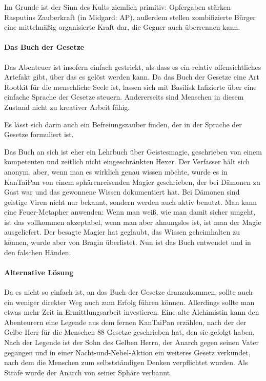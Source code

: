 \documentclass[a4paper,10pt]{scrartcl}
\def\drugname{Basilisk}
\begin{document}
Im Grunde ist der Sinn des Kults ziemlich primitiv: Opfergaben stärken
Rasputins Zauberkraft (in Midgard: AP), außerdem stellen zombifizierte
Bürger eine mittelmäßig organisierte Kraft dar, die Gegner auch
überrennen kann.

\paragraph{Das Buch der Gesetze}

Das Abenteuer ist insofern einfach gestrickt, als dass es ein relativ
offensichtliches Artefakt gibt, über das es gelöst werden kann. Da das
Buch der Gesetze eine Art Rootkit für die menschliche Seele ist, lassen
sich mit \drugname{} Infizierte über eine einfache Sprache der Gesetze
steuern. Andererseits sind Menschen in diesem Zustand nicht zu kreativer
Arbeit fähig.

Es lässt sich darin auch ein Befreiungszauber finden, der in der Sprache
der Gesetze formuliert ist.

Das Buch an sich ist eher ein Lehrbuch über Geistesmagie, geschrieben
von einem kompetenten und zeitlich nicht eingeschränkten Hexer. Der
Verfasser hält sich anonym, aber, wenn man es wirklich genau wissen
möchte, wurde es in KanTaiPan von einem sphärenreisenden Magier
geschrieben, der bei Dämonen zu Gast war und das gewonnene Wissen
dokumentiert hat. Bei Dämonen sind geistige Viren nicht nur bekannt,
sondern werden auch aktiv benutzt. Man kann eine Feuer-Metapher
anwenden: Wenn man weiß, wie man damit sicher umgeht, ist das vollkommen
akzeptabel, wenn man aber ahnungslos ist, ist man der Magie
ausgeliefert. Der besagte Magier hat geglaubt, das Wissen geheimhalten
zu können, wurde aber von Bragin überlistet. Nun ist das Buch entwendet
und in den falschen Händen.

\paragraph{Alternative Lösung}

Da es nicht so einfach ist, an das Buch der Gesetze dranzukommen, sollte
auch ein weniger direkter Weg auch zum Erfolg führen können. Allerdings
sollte man etwas mehr Zeit in Ermittlungsarbeit investieren. Eine alte
Alchimistin kann den Abenteurern eine Legende aus dem fernen KanTaiPan
erzählen, nach der der Gelbe Herr für die Menschen 88 Gesetze
geschrieben hat, den sie gefolgt haben. Nach der Legende ist der Sohn
des Gelben Herrn, der Anarch gegen seinen Vater gegangen und in einer
Nacht-und-Nebel-Aktion ein weiteres Gesetz verkündet, nach dem die
Menschen zum selbstständigen Denken verpflichtet wurden. Als Strafe
wurde der Anarch von seiner Sphäre verbannt.
\end{document}
